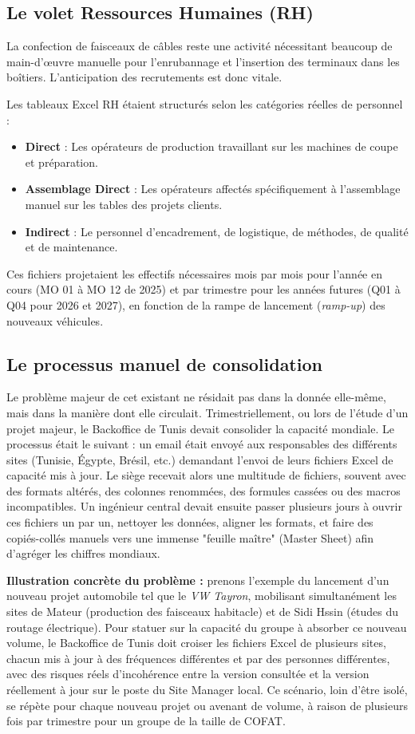 \subsection{Le volet Ressources Humaines (RH)}
La confection de faisceaux de câbles reste une activité nécessitant beaucoup de main-d'œuvre manuelle pour l'enrubannage et l'insertion des terminaux dans les boîtiers. L'anticipation des recrutements est donc vitale.

Les tableaux Excel RH étaient structurés selon les catégories réelles de personnel :
\begin{itemize}
    \item \textbf{Direct} : Les opérateurs de production travaillant sur les machines de coupe et préparation.
    \item \textbf{Assemblage Direct} : Les opérateurs affectés spécifiquement à l'assemblage manuel sur les tables des projets clients.
    \item \textbf{Indirect} : Le personnel d'encadrement, de logistique, de méthodes, de qualité et de maintenance.
\end{itemize}
Ces fichiers projetaient les effectifs nécessaires mois par mois pour l'année en cours (MO 01 à MO 12 de 2025) et par trimestre pour les années futures (Q01 à Q04 pour 2026 et 2027), en fonction de la rampe de lancement (\textit{ramp-up}) des nouveaux véhicules.

\subsection{Le processus manuel de consolidation}
Le problème majeur de cet existant ne résidait pas dans la donnée elle-même, mais dans la manière dont elle circulait. Trimestriellement, ou lors de l'étude d'un projet majeur, le Backoffice de Tunis devait consolider la capacité mondiale. 
Le processus était le suivant : un email était envoyé aux responsables des différents sites (Tunisie, Égypte, Brésil, etc.) demandant l'envoi de leurs fichiers Excel de capacité mis à jour. Le siège recevait alors une multitude de fichiers, souvent avec des formats altérés, des colonnes renommées, des formules cassées ou des macros incompatibles. 
Un ingénieur central devait ensuite passer plusieurs jours à ouvrir ces fichiers un par un, nettoyer les données, aligner les formats, et faire des copiés-collés manuels vers une immense "feuille maître" (Master Sheet) afin d'agréger les chiffres mondiaux.

\textbf{Illustration concrète du problème :} prenons l'exemple du lancement d'un nouveau projet automobile tel que le \textit{VW Tayron}, mobilisant simultanément les sites de Mateur (production des faisceaux habitacle) et de Sidi Hssin (études du routage électrique). Pour statuer sur la capacité du groupe à absorber ce nouveau volume, le Backoffice de Tunis doit croiser les fichiers Excel de plusieurs sites, chacun mis à jour à des fréquences différentes et par des personnes différentes, avec des risques réels d'incohérence entre la version consultée et la version réellement à jour sur le poste du Site Manager local. Ce scénario, loin d'être isolé, se répète pour chaque nouveau projet ou avenant de volume, à raison de plusieurs fois par trimestre pour un groupe de la taille de COFAT.


